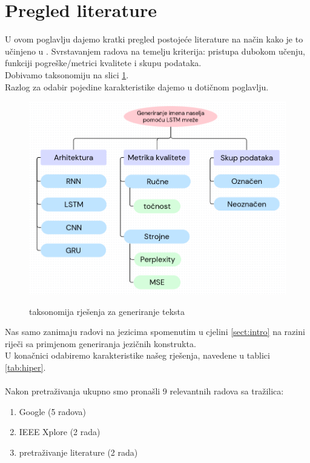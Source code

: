 \documentclass[conference]{IEEEtran}
\begin{document}
\section{Pregled literature}
U ovom poglavlju dajemo kratki pregled postojeće literature na način kako je to učinjeno u \cite{Fatima}. Svrstavanjem radova na temelju kriterija: pristupa dubokom učenju, funkciji pogreške/metrici kvalitete i skupu podataka.\\
Dobivamo taksonomiju na slici \ref{pic:takso}.\\
Razlog za odabir pojedine karakteristike dajemo u dotičnom poglavlju.



\begin{figure}[H]
\centering
\includegraphics[angle=90, scale=0.3]{./pics/taksonomija3.png}\\
\caption{taksonomija rješenja za generiranje teksta}
\label{pic:takso}
\end{figure}

Nas samo zanimaju radovi na jezicima spomenutim u cjelini \ref{sect:intro} na razini riječi sa primjenom generiranja jezičnih konstrukta.\\
U konačnici odabiremo karakteristike našeg rješenja, navedene u tablici \ref{tab:hiper}.\\
\\
Nakon pretraživanja ukupno smo pronašli 9 relevantnih radova sa tražilica:
\begin{enumerate}
\item Google (5 radova)
\item IEEE Xplore (2 rada)
\item pretraživanje literature (2 rada)
\end{enumerate}
\end{document}
